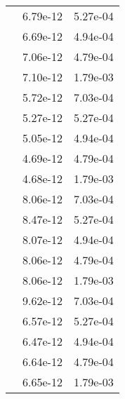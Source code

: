 \begin{table}
\begin{tabular}{c|cc|}
\multicolumn{1}{|c|}{} & \multicolumn{1}{|c|}{  6.79e-12} & \multicolumn{1}{|c|}{  5.27e-04} \\ 
\multicolumn{1}{|c|}{} & \multicolumn{1}{|c|}{  6.69e-12} & \multicolumn{1}{|c|}{  4.94e-04} \\ 
\multicolumn{1}{|c|}{} & \multicolumn{1}{|c|}{  7.06e-12} & \multicolumn{1}{|c|}{  4.79e-04} \\ 
\multicolumn{1}{|c|}{} & \multicolumn{1}{|c|}{  7.10e-12} & \multicolumn{1}{|c|}{  1.79e-03} \\ 
\multicolumn{1}{|c|}{} & \multicolumn{1}{|c|}{  5.72e-12} & \multicolumn{1}{|c|}{  7.03e-04} \\ 
\multicolumn{1}{|c|}{} & \multicolumn{1}{|c|}{  5.27e-12} & \multicolumn{1}{|c|}{  5.27e-04} \\ 
\multicolumn{1}{|c|}{} & \multicolumn{1}{|c|}{  5.05e-12} & \multicolumn{1}{|c|}{  4.94e-04} \\ 
\multicolumn{1}{|c|}{} & \multicolumn{1}{|c|}{  4.69e-12} & \multicolumn{1}{|c|}{  4.79e-04} \\ 
\multicolumn{1}{|c|}{} & \multicolumn{1}{|c|}{  4.68e-12} & \multicolumn{1}{|c|}{  1.79e-03} \\ 
\multicolumn{1}{|c|}{} & \multicolumn{1}{|c|}{  8.06e-12} & \multicolumn{1}{|c|}{  7.03e-04} \\ 
\multicolumn{1}{|c|}{} & \multicolumn{1}{|c|}{  8.47e-12} & \multicolumn{1}{|c|}{  5.27e-04} \\ 
\multicolumn{1}{|c|}{} & \multicolumn{1}{|c|}{  8.07e-12} & \multicolumn{1}{|c|}{  4.94e-04} \\ 
\multicolumn{1}{|c|}{} & \multicolumn{1}{|c|}{  8.06e-12} & \multicolumn{1}{|c|}{  4.79e-04} \\ 
\multicolumn{1}{|c|}{} & \multicolumn{1}{|c|}{  8.06e-12} & \multicolumn{1}{|c|}{  1.79e-03} \\ 
\multicolumn{1}{|c|}{} & \multicolumn{1}{|c|}{  9.62e-12} & \multicolumn{1}{|c|}{  7.03e-04} \\ 
\multicolumn{1}{|c|}{} & \multicolumn{1}{|c|}{  6.57e-12} & \multicolumn{1}{|c|}{  5.27e-04} \\ 
\multicolumn{1}{|c|}{} & \multicolumn{1}{|c|}{  6.47e-12} & \multicolumn{1}{|c|}{  4.94e-04} \\ 
\multicolumn{1}{|c|}{} & \multicolumn{1}{|c|}{  6.64e-12} & \multicolumn{1}{|c|}{  4.79e-04} \\ 
\multicolumn{1}{|c|}{} & \multicolumn{1}{|c|}{  6.65e-12} & \multicolumn{1}{|c|}{  1.79e-03} \\ 

\end{tabular}
\end{table}
